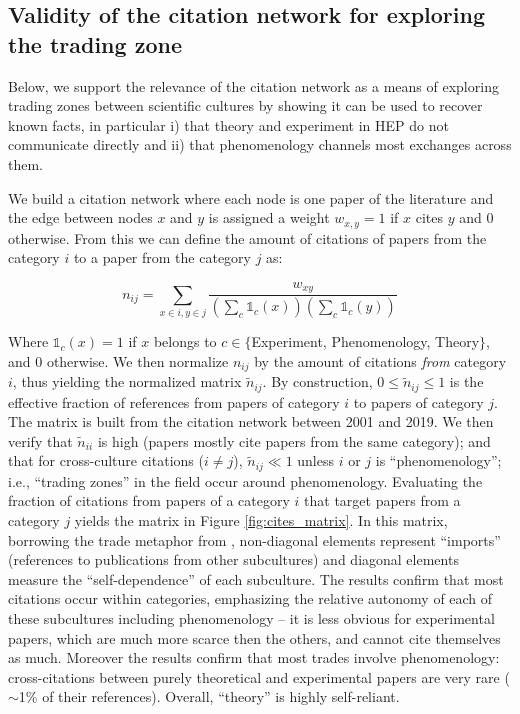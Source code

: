 \documentclass[smallextended]{svjour3}
\begin{document}
\subsection{\label{appendix:phenomenology_centrality}Validity of the citation network for exploring the trading zone}

Below, we support the relevance of the citation network as a means of exploring trading zones between scientific cultures by showing it can be used to recover known facts, in particular i) that theory and experiment in HEP do not communicate directly and ii) that phenomenology channels most exchanges across them.

We build a citation network where each node is one paper of the literature and the edge between nodes $x$ and $y$ is assigned a weight $w_{x,y}=1$ if $x$ cites $y$ and 0 otherwise. From this we can define the amount of citations of papers from the category $i$ to a paper from the category $j$ as: 

\begin{equation}
    \label{eq:cite_matrix}
    n_{ij} = \sum_{x\in i, y\in j} \dfrac{w_{xy}}{(\sum_c \mathds{1}_c(x))(\sum_c \mathds{1}_c(y))} 
\end{equation}

Where $\mathds{1}_c(x)=1$ if $x$ belongs to $c \in \{$Experiment, Phenomenology, Theory$\}$, and 0 otherwise. 
We then normalize $n_{ij}$ by the amount of citations \textit{from} category $i$, thus yielding the normalized matrix $\tilde{n}_{ij}$. By construction, $0\leq \tilde{n}_{ij}\leq 1$ is the effective fraction of references from papers of category $i$ to papers of category $j$. The matrix is built from the citation network between 2001 and 2019. We then verify that $\tilde{n}_{ii}$ is high (papers mostly cite papers from the same category); and that for cross-culture citations ($i\neq j$), $\tilde{n}_{ij} \ll 1$ unless $i$ or $j$ is ``phenomenology''; i.e., ``trading zones'' in the field occur around phenomenology. Evaluating the fraction of citations from papers of a category $i$ that target papers from a category $j$ yields the matrix in Figure \ref{fig:cites_matrix}. In this matrix, borrowing the trade metaphor from \citet{Yan2013}, non-diagonal elements represent ``imports'' (references to publications from other subcultures) and diagonal elements measure the ``self-dependence'' of each subculture. The results confirm that most citations occur within categories, emphasizing the relative autonomy of each of these subcultures including phenomenology -- it is less obvious for experimental papers, which are much more scarce then the others, and cannot cite themselves as much. Moreover the results confirm that most trades involve phenomenology: cross-citations between purely theoretical and experimental papers are very rare ($\sim$1\% of their references). Overall, ``theory'' is highly self-reliant.
\end{document}
